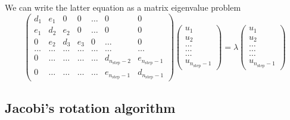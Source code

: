 \documentclass[a4paper]{revtex4}
\begin{document}
We can write the latter equation as a matrix eigenvalue problem
\begin{equation}
    \left( \begin{array}{ccccccc} d_1 & e_1 & 0   & 0    & \dots  &0     & 0 \\
                                e_1 & d_2 & e_2 & 0    & \dots  &0     &0 \\
                                0   & e_2 & d_3 & e_3  &0       &\dots & 0\\
                                \dots  & \dots & \dots & \dots  &\dots      &\dots & \dots\\
                                0   & \dots & \dots & \dots  &\dots       &d_{n_{\mathrm{step}}-2} & e_{n_{\mathrm{step}}-1}\\
                                0   & \dots & \dots & \dots  &\dots       &e_{n_{\mathrm{step}}-1} & d_{n_{\mathrm{step}}-1}

             \end{array} \right)      \left( \begin{array}{c} u_{1} \\
                                                              u_{2} \\
                                                              \dots\\ \dots\\ \dots\\
                                                              u_{n_{\mathrm{step}}-1}
             \end{array} \right)=\lambda \left( \begin{array}{c} u_{1} \\
                                                              u_{2} \\
                                                              \dots\\ \dots\\ \dots\\
                                                              u_{n_{\mathrm{step}}-1}
             \end{array} \right)
      \label{eq:sematrix}
\end{equation}

\subsection{Jacobi's rotation algorithm}
\end{document}
